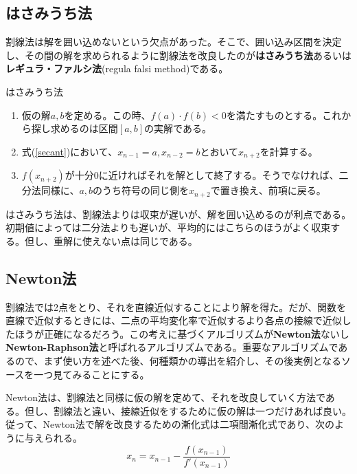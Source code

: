 \subsection{はさみうち法}
割線法は解を囲い込めないという欠点があった。そこで、囲い込み区間を決定し、その間の解を求められるように割線法を改良したのが\textbf{はさみうち法}あるいは\textbf{レギュラ・ファルシ法}(regula falsi method)である。
\begin{itembox}[l]{はさみうち法}
\begin{enumerate}
\item 仮の解$a,b$を定める。この時、$f(a)\cdot f(b)<0$を満たすものとする。これから探し求めるのは区間$[a,b]$の実解である。
\item 式(\ref{secant})において、$x_{n-1}=a,x_{n-2}=b$とおいて$x_{n+2}$を計算する。
\item $f(x_{n+2})$が十分0に近ければそれを解として終了する。そうでなければ、二分法同様に、$a,b$のうち符号の同じ側を$x_{n+2}$で置き換え、前項に戻る。
\end{enumerate}
\end{itembox}

はさみうち法は、割線法よりは収束が遅いが、解を囲い込めるのが利点である。初期値によっては二分法よりも遅いが、平均的にはこちらのほうがよく収束する。但し、重解に使えない点は同じである。

\subsection{Newton法}
割線法では2点をとり、それを直線近似することにより解を得た。だが、関数を直線で近似するときには、二点の平均変化率で近似するより各点の接線で近似したほうが正確になるだろう。この考えに基づくアルゴリズムが\textbf{Newton法}ないし\textbf{Newton-Raphson法}と呼ばれるアルゴリズムである。重要なアルゴリズムであるので、まず使い方を述べた後、何種類かの導出を紹介し、その後実例となるソースを一つ見てみることにする。

Newton法は、割線法と同様に仮の解を定めて、それを改良していく方法である。但し、割線法と違い、接線近似をするために仮の解は一つだけあれば良い。従って、Newton法で解を改良するための漸化式は二項間漸化式であり、次のように与えられる。
\begin{equation}
x_{n}=x_{n-1}-\frac{f(x_{n-1})}{f'(x_{n-1})} \label{Newton}
\end{equation}

